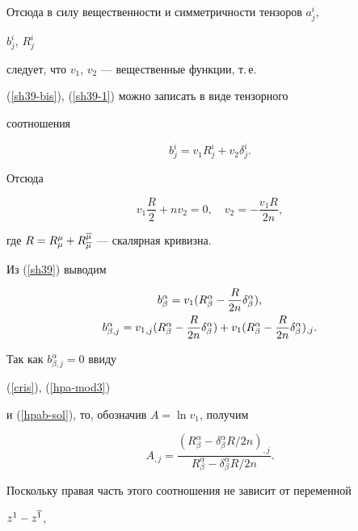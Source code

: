 Отсюда в силу вещественности и симметричности тензоров $a^i_j$,


$b^i_j$, $R^i_j$


следует, что $v_1$, $v_2$ --- вещественные функции, т.\,е.


(\ref{sh39-bis}), (\ref{sh39-1}) можно записать в виде тензорного


соотношения


\begin{equation}


\label{sh39}


b^i_j = v_1 R^i_j + v_2 \delta_j^i.


\end{equation}


Отсюда


$$


v_1 \frac{R}{2} + n v_2 = 0, \quad v_2 = - \frac{v_1 R}{2n},


$$


где $R = R^\mu_\mu + R_{\overline\mu}^{\overline\mu}$ --- скалярная кривизна.


Из (\ref{sh39}) выводим


\begin{gather}


\label{sh40}


b^\alpha_\beta = v_1 (R^\alpha_\beta - \frac{R}{2n}


\delta_\beta^\alpha),\\


b^\alpha_{\beta,j} = {v_1}_{,j}(R^\alpha_\beta -


\frac{R}{2n}\delta_\beta^\alpha) +


v_1 (R^\alpha_\beta - \frac{R}{2n} \delta_\beta^\alpha)_{,j}.\notag


\end{gather}


Так как $b^\alpha_{\beta,j} = 0$ ввиду


(\ref{cris}), (\ref{hpa-mod3})


и (\ref{hpab-sol}), то, обозначив $A=\ln v_1$, получим


$$


A_{,j}=\frac{(R^\alpha_\beta-


\delta^\alpha_\beta R/2n)_{,j}}


{R^\alpha_\beta - \delta^\alpha_\beta R/2n}.


$$


Поскольку правая часть этого соотношения не зависит от переменной


$z^1 -z^{\overline 1}$,


